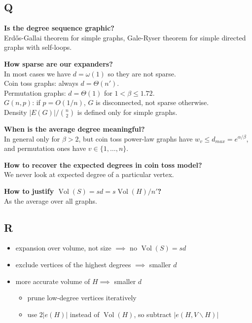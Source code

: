 \documentclass{beamer}
\DeclareMathOperator*{\Vol}{Vol}
\newcommand{\autotitle}{\secname\ifdefempty{\subsecname}{}{~--- \subsecname}}
\begin{document}
\subsection{Q}

\begin{frame}{\autotitle}
    \textbf{Is the degree sequence graphic?}\\
    Erd\H{o}s-Gallai theorem for simple graphs,
    Gale-Ryser theorem for simple directed graphs with self-loops.
    
    \textbf{How sparse are our expanders?}\\
    In most cases we have $d=\omega(1)$ so they are not sparse.\\
    Coin toss graphs: always $d=\Theta(n')$.\\
    Permutation graphs: $d=\Theta(1)$ for $1<\beta\leq 1.72$.\\
    $G(n,p)$: if $p=O(1/n)$, $G$ is disconnected, not sparse otherwise.\\
    Density $|E(G)|/\binom{n}{2}$ is defined only for simple graphs.
\end{frame}

\begin{frame}{\autotitle}
    \textbf{When is the average degree meaningful?}\\
    In general only for $\beta>2$, but coin toss power-law graphs
    have $w_v\leq d_{max}=e^{\alpha/\beta}$, and permutation ones have $v\in\{1,\ldots,n\}$.
    
    \textbf{How to recover the expected degrees in coin toss model?}\\
    We never look at expected degree of a particular vertex.
    
    \textbf{How to justify $\Vol(S)=sd=s\Vol(H)/n'$?}\\
    As the average over all graphs.
\end{frame}

\subsection{R}

\begin{frame}{\autotitle}
    \begin{itemize}
        \item expansion over volume, not size $\implies$ no $\Vol(S)=sd$
        \item exclude vertices of the highest degrees $\implies$ smaller $d$
        \item more accurate volume of $H\implies$ smaller $d$
        \begin{itemize}
            \item prune low-degree vertices iteratively
            \item use $2|e(H)|$ instead of $\Vol(H)$, so subtract $|e(H,V\backslash H)|$
        \end{itemize}
    \end{itemize}
\end{frame}
\end{document}
